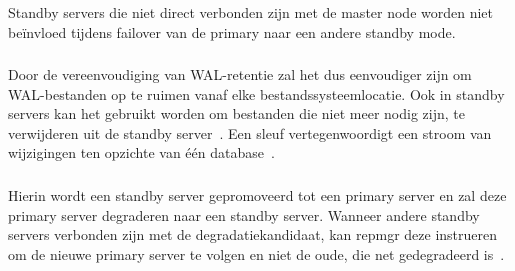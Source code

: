 \subsubsection{}
\label{subsubsec:Cascading Standby Support}

Standby servers die niet direct verbonden zijn met de master node worden niet beïnvloed tijdens failover van de primary naar een andere standby mode.

\subsubsection{}
\label{subsubsec:Vereenvoudigen van het beheer van WAL-retentie en ondersteuning voor replicatiesleuven}

Door de vereenvoudiging van WAL-retentie zal het dus eenvoudiger zijn om WAL-bestanden op te ruimen vanaf elke bestandssysteemlocatie. Ook in standby servers kan het gebruikt worden om bestanden die niet meer nodig zijn, te verwijderen uit de standby server~\autocite{Augustine2019}.
Een sleuf vertegenwoordigt een stroom van wijzigingen ten opzichte van één database~\autocite{Ranganathan2020}.

\subsubsection{}
\label{subsubsec:Switchover ondersteuning voor rolswitching tussen primary en standby}

Hierin wordt een standby server gepromoveerd tot een primary server en zal deze primary server degraderen naar een standby server. Wanneer andere standby servers verbonden zijn met de degradatiekandidaat, kan repmgr deze instrueren om de nieuwe primary server te volgen en niet de oude, die net gedegradeerd is~\autocite{2021b}. %

